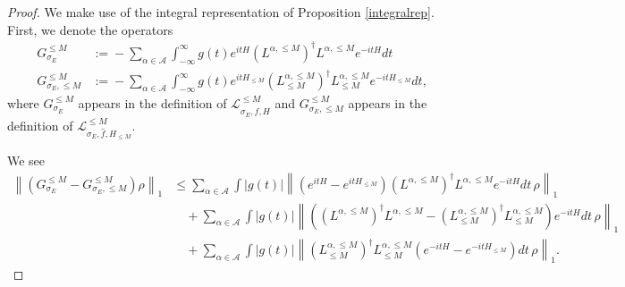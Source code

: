 \documentclass[11pt]{amsart}
\newcommand{\nn}{\nonumber}
\newcommand{\1}{\mathbbm{1}}
\newcommand{\cA}{\mathcal{A}}
\newcommand{\bin}[1]{}
\theoremstyle{plain}
\theoremstyle{definition}
\theoremstyle{remark}
\numberwithin{equation}{section}
\begin{document}
\begin{proof}
We make use of the integral representation of Proposition \ref{integralrep}. First, we denote the operators
\begin{align*}
G^{\le M}_{\sigma_E}\!&:=\!-\sum_{\alpha\in\cA}\!\int_{-\infty}^\infty\! \!\!\!\!g(t)e^{itH} (L^{\alpha,\le M})^\dagger L^{\alpha,\le M}e^{-itH}\!dt\\G^{\le M}_{\sigma_E,\le M}\!&:=\!-\sum_{\alpha\in\cA}\!\int_{-\infty}^\infty\! \!\!\!\!g(t)e^{itH_{\le M}} (L_{\le M}^{\alpha,\le M})^\dagger L_{\le M}^{\alpha,\le M}e^{-itH_{\le M}}\!dt,
\end{align*}
    where $G^{\le M}_{\sigma_E}$ appears in the definition of $\mathcal{L}^{\le M}_{\sigma_E,\widehat{f},H}$ and $G^{\le M}_{\sigma_E,\le M}$ appears in the definition of $\mathcal{L}^{\le M}_{\sigma_E,\widehat{f},H_{\le M}}.$
\bin{Following exactly the steps as in the proof of Proposition~\ref{prop:generatorboundTrunc} while utilising Lemma~\ref{lem:integralrepapproxFullyFinite} instead of Lemma~\ref{lem:integralrepapproxTrunc}, we see 
\begin{align}
    \nn&\left\|\left(G^{\le M}_{\sigma_E}+\sum_{\alpha\in\cA}\!\int_{-\infty}^\infty\! \!\!\!\!g(t)e^{-itH} (L_{\le M}^{\alpha,\le M})^\dagger L_{\le M}^{\alpha,\le M}e^{itH}\!dt\right)\rho\right\|_1 \\&\le C_{\beta,r,\kappa}C_fC'_f\,\sigma_E
\exp\!\left(\tfrac{\pi^2}{8\beta^2\sigma_E^2}\right)|\cA|p_2(|\cA|,M)e^{-M^{\kappa}}\sqrt{E_4},
\end{align}
for some constant $C_{\beta,r,\kappa}\ge 0.$
On the other hand, we see
\begin{align*}
  \nn&\left\|\left(G^{\le M}_{\sigma_E,\le M}+\sum_{\alpha\in\cA}\!\int_{-\infty}^\infty\! \!\!\!\!g(t)e^{-itH} (L_{\le M}^{\alpha,\le M})^\dagger L_{\le M}^{\alpha,\le M}e^{itH}\!dt\right)\rho\right\|_1  \\&\nn\le \sum_{\alpha\in\cA}\int |g(t)| \left\|\left(e^{-itH}-e^{-itH_{\le M}}\right) (L_{\le M}^{\alpha,\le M})^\dagger L_{\le M}^{\alpha,\le M} e^{itH}dt\rho \right\|_1\\&\qquad+\sum_{\alpha\in\cA}\int |g(t)| \left\|(L_{\le M}^{\alpha,\le M})^\dagger L_{\le M}^{\alpha,\le M} \left(e^{itH}-e^{itH_{\le M}}\right) dt\rho\right\|_1
\end{align*}}
We see
\begin{align}
\label{eq:MoreGApproxiii}
\nn\left\|\left(G^{\le M}_{\sigma_E}-G^{\le M}_{\sigma_E,\le M}\right)\rho\right\|_1 &\le \sum_{\alpha\in\cA }\int |g(t)| \left\|\left(e^{itH}-e^{itH_{\le M}}\right) (L^{\alpha,\le M})^\dagger L^{\alpha,\le M} e^{-itH}dt\,\rho \right\|_1\\&\quad\nn+\sum_{\alpha\in\cA }\int |g(t)| \left\|\left((L^{\alpha,\le M})^\dagger L^{\alpha,\le M} -(L^{\alpha,\le M}_{\le M})^\dagger L^{\alpha,\le M}_{\le M}\right)e^{-itH}dt\,\rho \right\|_1\\&\quad+\sum_{\alpha\in\cA }\int |g(t)| \left\|(L^{\alpha,\le M}_{\le M})^\dagger L^{\alpha,\le M}_{\le M}\left(e^{-itH}-e^{-itH_{\le M}}\right)dt\,\rho \right\|_1.

\end{align}
\end{proof}
\end{document}
